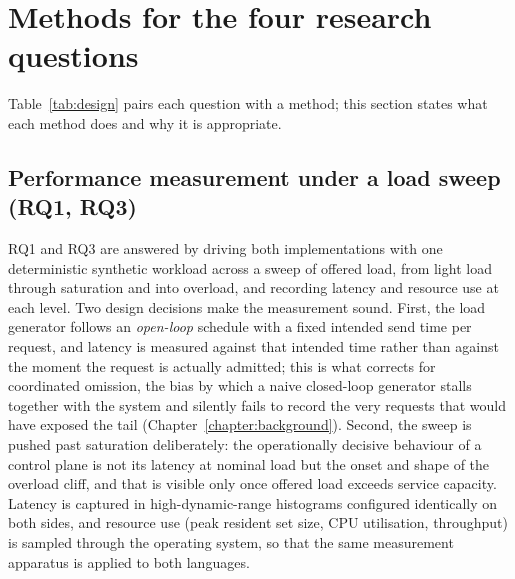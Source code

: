 \documentclass[english,twoside,openright,a4paper,censored,csm,software-track-2020]{HYthesisML}
\begin{document}
\section{Methods for the four research questions}
Table~\ref{tab:design} pairs each question with a method; this section states what each method
does and why it is appropriate.

\subsection{Performance measurement under a load sweep (RQ1, RQ3)}
RQ1 and RQ3 are answered by driving both implementations with one deterministic synthetic
workload across a sweep of offered load, from light load through saturation and into overload,
and recording latency and resource use at each level. Two design decisions make the
measurement sound. First, the load generator follows an \emph{open-loop} schedule with a fixed
intended send time per request, and latency is measured against that intended time rather than
against the moment the request is actually admitted; this is what corrects for coordinated
omission, the bias by which a naive closed-loop generator stalls together with the system and
silently fails to record the very requests that would have exposed the tail
(Chapter~\ref{chapter:background}). Second, the sweep is pushed past saturation deliberately:
the operationally decisive behaviour of a control plane is not its latency at nominal load but
the onset and shape of the overload cliff, and that is visible only once offered load exceeds
service capacity. Latency is captured in high-dynamic-range histograms configured identically
on both sides, and resource use (peak resident set size, CPU utilisation, throughput) is
sampled through the operating system, so that the same measurement apparatus is applied to both
languages.
\end{document}
